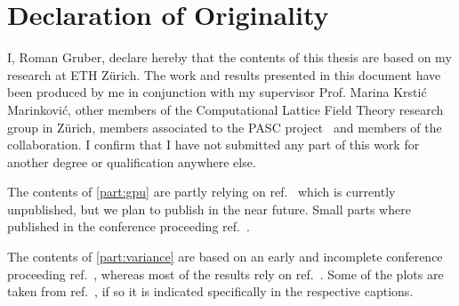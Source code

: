 \begingroup
\let\clearpage\relax
\let\cleardoublepage\relax
\let\cleardoublepage\relax

\chapter*{Declaration of Originality}

I, Roman Gruber, declare hereby that the contents of this thesis are based on my research at ETH Zürich.
The work and results presented in this document have been produced by me in conjunction with my supervisor Prof. Marina Krstić Marinković, other members of the Computational Lattice Field Theory research group in Zürich, members associated to the PASC project~\cite{online:pasc2021} and members of the \RCstar collaboration.
I confirm that I have not submitted any part of this work for another degree or qualification anywhere else.

The contents of \cref{part:gpu} are partly relying on ref.~ which is currently unpublished, but we plan to publish in the near future.
Small parts where published in the conference proceeding ref.~.

The contents of \cref{part:variance} are based on an early and incomplete conference proceeding ref.~, whereas most of the results rely on ref.~.
Some of the plots are taken from ref.~, if so it is indicated specifically in the respective captions.

\endgroup
